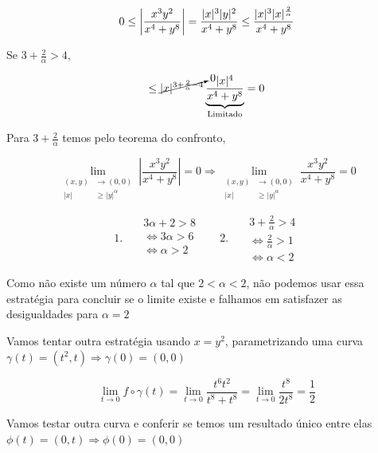 \documentclass[
  portuguese,
  letterpaper,
  DIV=11,
  numbers=noendperiod]{scrreport}
\begin{document}
\[
0 \leq \left\lvert\frac{x^3y^2}{x^4+y^8} \right\rvert=
\frac{\lvert x \rvert^3 \lvert y \rvert^2}{x^4+y^8} \leq
\frac{\lvert x \rvert^{3} \lvert x \rvert^{\frac{2}{\alpha}}}{x^4+y^8} \\
\]

Se \(3 + \frac{2}{\alpha} > 4\),

\[
\leq \cancelto{0}{\lvert x \rvert^{3+\frac{2}{\alpha}-4}}
\underbrace{\frac{\lvert x \rvert^{4}}{x^4+y^8}}_{\text{Limitado}} = 0
\]

Para \(3 + \frac{2}{\alpha}\) temos pelo teorema do confronto,

\[
\lim_{\begin{aligned}(x,y)&\rightarrow (0,0) \\ 
\lvert x \rvert & \geq \lvert y \rvert^{\alpha} \end{aligned}}
\left\lvert \frac{x^3y^2}{x^4+y^8} \right\rvert = 0 \Rightarrow
\lim_{\begin{aligned}(x,y)&\rightarrow (0,0) \\ 
\lvert x \rvert & \geq \lvert y \rvert^{\alpha} \end{aligned}}
\frac{x^3y^2}{x^4+y^8} = 0
\]

\[
1. ~~~
\begin{aligned}
  &3\alpha + 2 > 8 \\
  &\Leftrightarrow 3\alpha > 6 \\
  &\Leftrightarrow \alpha > 2 \\
\end{aligned} ~~~~~~~~
2. ~~~
\begin{aligned}
  &3 + \frac{2}{\alpha} > 4 \\
  &\Leftrightarrow \frac{2}{\alpha} > 1 \\
  &\Leftrightarrow \alpha < 2
\end{aligned}
\]

Como não existe um número \(\alpha\) tal que \(2 < \alpha < 2\), não
podemos usar essa estratégia para concluir se o limite existe e falhamos
em satisfazer as desigualdades para \(\alpha = 2\)

Vamos tentar outra estratégia usando \(x = y^2\), parametrizando uma
curva \(\gamma(t)=(t^2,t) \Rightarrow \gamma(0) = (0,0)\)

\[
\lim_{t\rightarrow 0} f \circ \gamma (t) = \lim_{t\rightarrow 0}
\frac{t^6 t^2}{t^8 + t^8} = \lim_{t\rightarrow 0} \frac{t^8}{2t^8} = \frac{1}{2}
\]

Vamos testar outra curva e conferir se temos um resultado único entre
elas \(\phi(t) = (0,t) \Rightarrow \phi(0) = (0,0)\)
\end{document}
